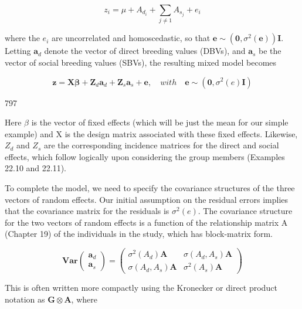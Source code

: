 \documentclass{article}
\begin{document}
\begin{equation}
z_{i}=\mu+A_{d_{i}}+\sum_{j\neq1}A_{s_{j}}+e_{i}
\tag{22.38b}
\label{eq:22_38b}
\end{equation}

where the  $ e_i $ are uncorrelated and homoscedastic, so that  $ \mathbf{e} \sim (\mathbf{0}, \sigma^2(\mathbf{e}))\mathbf{I} $. Letting  $ \mathbf{a}_d $ denote the vector of direct breeding values (DBVs), and  $ \mathbf{a}_s $ be the vector of social breeding values (SBVs), the resulting mixed model becomes

\begin{equation}
\mathbf{z}=\mathbf{X}\boldsymbol{\beta}+\mathbf{Z}_{d}\mathbf{a}_{d}+\mathbf{Z}_{s}\mathbf{a}_{s}+\mathbf{e},\quad with\quad\mathbf{e}\sim(\mathbf{0},\sigma^{2}(e)\mathbf{I})
\tag{22.38c}
\label{eq:22_38c}
\end{equation}

797

Here  $ \beta $ is the vector of fixed effects (which will be just the mean for our simple example) and X is the design matrix associated with these fixed effects. Likewise,  $ Z_{d} $ and  $ Z_{s} $ are the corresponding incidence matrices for the direct and social effects, which follow logically upon considering the group members (Examples 22.10 and 22.11).

To complete the model, we need to specify the covariance structures of the three vectors of random effects. Our initial assumption on the residual errors implies that the covariance matrix for the residuals is  $ \sigma^2(e) $. The covariance structure for the two vectors of random effects is a function of the relationship matrix A (Chapter 19) of the individuals in the study, which has block-matrix form.

\begin{equation}
\mathbf{V a r}\begin{pmatrix}\mathbf{a}_{d}\\ \mathbf{a}_{s}\end{pmatrix}=\begin{pmatrix}\sigma^{2}(A_{d})\mathbf{A}&\sigma(A_{d},A_{s})\mathbf{A}\\ \sigma(A_{d},A_{s})\mathbf{A}&\sigma^{2}(A_{s})\mathbf{A}\end{pmatrix}
\tag{22.39a}
\label{eq:22_39a}
\end{equation}

This is often written more compactly using the Kronecker or direct product notation as  $ \mathbf{G} \otimes \mathbf{A} $, where
\end{document}
